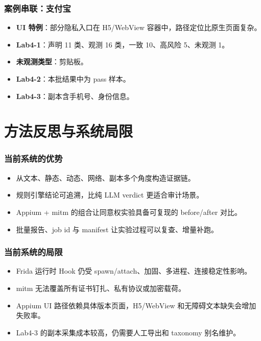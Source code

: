 \documentclass[AutoFakeBold,AutoFakeSlant]{beamer}
\begin{document}
\begin{frame}
    \frametitle{案例串联：支付宝}
    \small
    \begin{itemize}
        \item \textbf{UI 特例}：部分隐私入口在 H5/WebView 容器中，路径定位比原生页面复杂。
        \item \textbf{Lab4-1}：声明 11 类、观测 16 类，一致 10、高风险 5、未观测 1。
        \item \textbf{未观测类型}：剪贴板。
        \item \textbf{Lab4-2}：本批结果中为 pass 样本。
        \item \textbf{Lab4-3}：副本含手机号、身份信息。
    \end{itemize}
\end{frame}

\section{方法反思与系统局限}

\begin{frame}
    \frametitle{当前系统的优势}
    \small
    \begin{itemize}
        \item 从文本、静态、动态、网络、副本多个角度构造证据链。
        \item 规则引擎结论可追溯，比纯 LLM verdict 更适合审计场景。
        \item Appium + mitm 的组合让同意权实验具备可复现的 before/after 对比。
        \item 批量报告、job id 与 manifest 让实验过程可以复查、增量补跑。
    \end{itemize}
\end{frame}

\begin{frame}
    \frametitle{当前系统的局限}
    \small
    \begin{itemize}
        \item Frida 运行时 Hook 仍受 spawn/attach、加固、多进程、连接稳定性影响。
        \item mitm 无法覆盖所有证书钉扎、私有协议或加密载荷。
        \item Appium UI 路径依赖具体版本页面，H5/WebView 和无障碍文本缺失会增加失败率。
        \item Lab4-3 的副本采集成本较高，仍需要人工导出和 taxonomy 别名维护。
    \end{itemize}
\end{frame}
\end{document}
